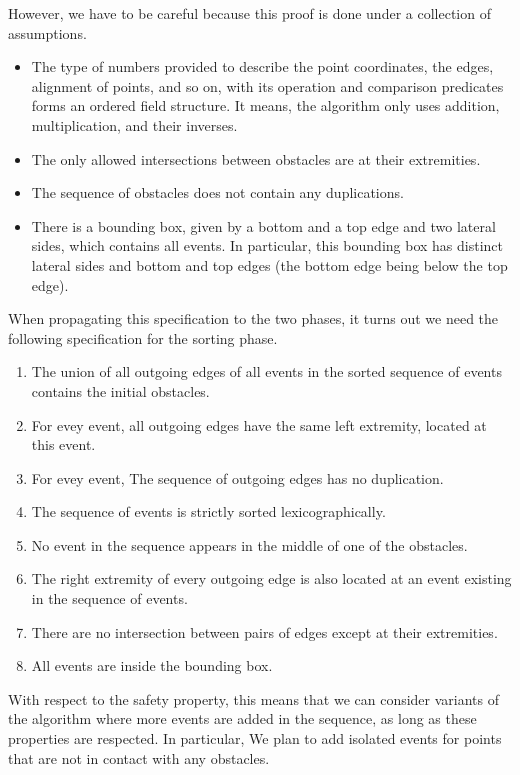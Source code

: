 \documentclass[a4paper, USenglish, cleveref, autoref, thm-restate]{lipics-v2021}
\begin{document}
However, we have to be careful because this proof is done under a
collection of assumptions.
\begin{itemize}
\item The type of numbers provided to describe the point coordinates,
  the edges, alignment of points, and so on, with its operation and
  comparison predicates forms an ordered field structure.  It means, the
  algorithm only uses addition, multiplication, and their inverses.
\item The only allowed intersections between obstacles are at their
  extremities.
\item The sequence of obstacles does not contain any duplications.
\item There is a bounding box, given by a bottom and a top edge and two
  lateral sides, which contains all events.  In particular, this bounding box
  has distinct lateral sides and bottom and top edges (the bottom edge being
  below the top edge).
\end{itemize}
When propagating this specification to the two phases, it turns out we
need the following specification for the sorting phase.
\begin{enumerate}
\item The union of all outgoing edges of all events in the sorted
  sequence of events contains the initial obstacles.
\item For evey event, all outgoing edges have the same left
  extremity, located at this event.
\item For evey event, The sequence of outgoing edges has no duplication.
\item The sequence of events is strictly sorted lexicographically.
\item No event in the sequence appears in the middle of one of the
  obstacles.
\item The right extremity of every outgoing edge is also located at an
  event existing in the sequence of events.
\item There are no intersection between pairs of edges except at their
  extremities.
\item All events are inside the bounding box.
\end{enumerate}
With respect to the safety property, this means that we can consider
variants of the algorithm where more events are added in the sequence,
as long as these properties are respected.  In particular,
We plan to add isolated events for points that are not in contact with
any obstacles.
\end{document}
